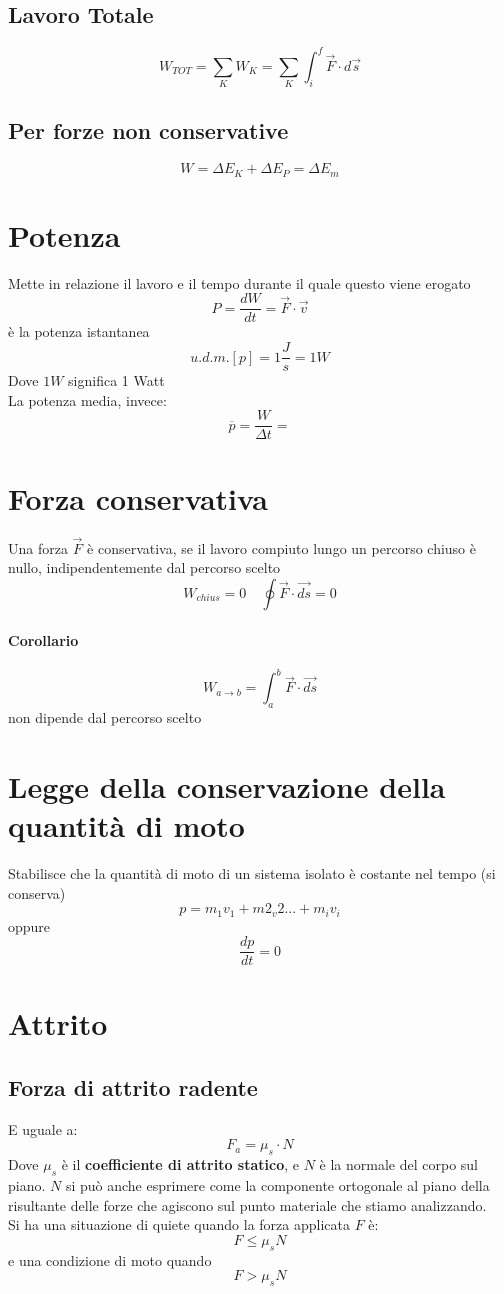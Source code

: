 \documentclass[a4paper]{report}
\begin{document}
  \subsection{Lavoro Totale}
  \[ W_{TOT} = \sum_K W_K = \sum_K \int_i^f \vec{F}\cdot d\vec{s} \]
  \subsection{Per forze non conservative}
  \[ W = \Delta E_K + \Delta E_P = \Delta E_m \]


  \section{Potenza}
  Mette in relazione il lavoro e il tempo durante il quale questo viene erogato
  \[ P = \frac{dW}{dt} = \vec{F} \cdot \vec{v} \]
  è la potenza istantanea
  \[ u.d.m.[p] = 1 \frac{J}{s} = 1W \]
  Dove $1W$ significa 1 Watt\\
  La potenza media, invece:
  \[ \overbar{p} = \frac{W}{\Delta t} =  \]


  \section{Forza conservativa}
  Una forza $\vec{F}$ è conservativa, se il lavoro compiuto lungo un percorso chiuso è nullo, indipendentemente dal percorso scelto
  \[ W_{chius} = 0 \quad \oint \vec{F} \cdot \vec{ds} = 0 \]
  \paragraph{Corollario}
  \[ W_{a \rightarrow b} = \int_a^b \vec{F}\cdot \vec{ds} \]
  non dipende dal percorso scelto

  \section{Legge della conservazione della quantità di moto}
  Stabilisce che la quantità di moto di un sistema isolato è costante nel tempo (si conserva)
  \[ p = m_1v_1 + m2_v2 ... + m_iv_i \]
  oppure
  \[ \frac{dp}{dt} = 0 \]



  \section{Attrito}
  \subsection{Forza di attrito radente}
  E uguale a:
  \[ F_a = \mu_s \cdot N\]
  Dove $\mu_s$ è il \textbf{coefficiente di attrito statico}, e $N$ è la normale del corpo sul piano. $N$ si può anche esprimere come la componente ortogonale al piano della risultante delle forze che agiscono sul punto materiale che stiamo analizzando.
  \\Si ha una situazione di quiete quando la forza applicata $F$ è:
  \[ F \leq \mu_s N \]
  e una condizione di moto quando
  \[ F > \mu_s N \]
\end{document}
